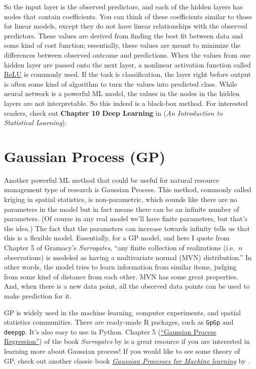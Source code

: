 \documentclass[
]{book}
\begin{document}
So the input layer is the observed predictors, and each of the hidden layers has nodes that contain coefficients. You can think of these coefficients similar to those for linear models, except they do not have linear relationships with the observed predictors. These values are derived from finding the best fit between data and some kind of cost function; essentially, these values are meant to minimize the differences between observed outcome and predictions. When the values from one hidden layer are passed onto the next layer, a nonlinear activation function called \href{https://en.wikipedia.org/wiki/Rectifier_(neural_networks)}{ReLU} is commonly used. If the task is classification, the layer right before output is often some kind of algorithm to turn the values into predicted class. While neural network is a powerful ML model, the values in the nodes in the hidden layers are not interpretable. So this indeed is a black-box method. For interested readers, check out \textbf{Chapter 10 Deep Learning} in \citet{james2013introduction} (\emph{An Introduction to Statistical Learning}).

\hypertarget{gaussian-process-gp}{%
\section{Gaussian Process (GP)}\label{gaussian-process-gp}}

Another powerful ML method that could be useful for natural resource management type of research is Gaussian Process. This method, commonly called kriging in spatial statistics, is non-parametric, which sounds like there are no parameters in the model but in fact means there can be an infinite number of parameters. (Of course in any real model we'll have finite parameters, but that's the idea.) The fact that the parameters can increase towards infinity tells us that this is a flexible model. Essentially, for a GP model, and here I quote from Chapter 5 of Gramacy's \emph{Surrogates}, ``any finite collection of realizations (i.e.~\(n\) observations) is modeled as having a multivariate normal (MVN) distribution.'' In other words, the model tries to learn information from similar items, judging from some kind of distance from each other. MVN has some great properties. And, when there is a new data point, all the observed data points can be used to make prediction for it.

GP is widely used in the machine learning, computer experiments, and spatial statistics communities. There are ready-made R packages, such as \texttt{GpGp} and \texttt{deepgp}. It's also easy to use in Python. Chapter 5 (\href{https://bookdown.org/rbg/surrogates/chap5.html}{``Gaussian Process Regression''}) of the book \emph{Surrogates} by \citet{gramacy2020surrogates} is a great resource if you are interested in learning more about Gaussian process! If you would like to see some theory of GP, check out another classic book \href{https://gaussianprocess.org/gpml/}{\emph{Gaussian Processes for Machine learning}} by \citet{CR2006gp}.
\end{document}
